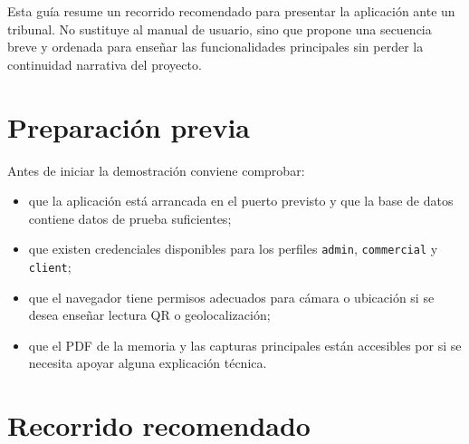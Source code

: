 Esta guía resume un recorrido recomendado para presentar la aplicación ante un tribunal. No sustituye al manual de usuario, sino que propone una secuencia breve y ordenada para enseñar las funcionalidades principales sin perder la continuidad narrativa del proyecto.

\section{Preparación previa}

Antes de iniciar la demostración conviene comprobar:

\begin{itemize}
    \item que la aplicación está arrancada en el puerto previsto y que la base de datos contiene datos de prueba suficientes;
    \item que existen credenciales disponibles para los perfiles \texttt{admin}, \texttt{commercial} y \texttt{client};
    \item que el navegador tiene permisos adecuados para cámara o ubicación si se desea enseñar lectura QR o geolocalización;
    \item que el PDF de la memoria y las capturas principales están accesibles por si se necesita apoyar alguna explicación técnica.
\end{itemize}

\section{Recorrido recomendado}

